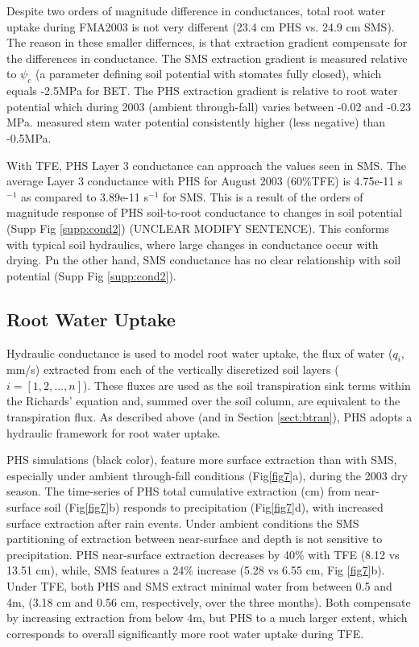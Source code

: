 \documentclass[draft,linenumbers]{agujournal}
\begin{document}
    Despite two orders of magnitude difference in conductances, total root water uptake during FMA2003 is not very different (23.4 cm PHS vs. 24.9 cm SMS).
    The reason in these smaller differnces, is that extraction gradient compensate for the differences in conductance.
    The SMS extraction gradient is measured relative to $\psi_c$ (a parameter defining soil potential with stomates fully closed), which equals -2.5MPa for BET.
    The PHS extraction gradient is relative to root water potential which during 2003 (ambient through-fall) varies between -0.02 and -0.23 MPa.
    \citet{fisher2006} measured stem water potential consistently higher (less negative) than -0.5MPa.
    
    With TFE, PHS Layer 3 conductance can approach the values seen in SMS. 
    The average Layer 3 conductance with PHS for August 2003 (60\%TFE) is 4.75e-11 s$^{-1}$ as compared to 3.89e-11 s$^{-1}$ for SMS.
    This is a result of the orders of magnitude response of PHS soil-to-root conductance to changes in soil potential (Supp Fig \ref{supp:cond2}) (UNCLEAR MODIFY SENTENCE). 
    This conforms with typical soil hydraulics, where large changes in conductance occur with drying.
    Pn the other hand, SMS conductance has no clear relationship with soil potential (Supp Fig \ref{supp:cond2}). 

\subsection{Root Water Uptake}
\label{sect:rwu}

    Hydraulic conductance is used to model root water uptake, the flux of water ($q_i$, mm/s) 
    extracted from each of the vertically discretized soil layers ($i=\left[1,2,...,n\right]$).
    These fluxes are used as the soil transpiration sink terms within the Richards' equation \citep{oleson2013} and, summed over the soil column, are equivalent to the transpiration flux.
    As described above (and in Section \ref{sect:btran}), PHS adopts a hydraulic framework for root water uptake. 

    PHS simulations (black color), feature more surface extraction than with SMS, especially under ambient through-fall conditions (Fig\ref{fig7}a), during the 2003 dry season.
    The time-series of PHS total cumulative extraction (cm) from near-surface soil (Fig\ref{fig7}b) responds to precipitation (Fig\ref{fig7}d), 
    with increased surface extraction after rain events.
    Under ambient conditions the SMS partitioning of extraction between near-surface and depth is not sensitive to precipitation.
    PHS near-surface extraction decreases by 40\% with TFE (8.12 vs 13.51 cm), while, SMS features a 24\% increase (5.28 vs 6.55 cm, Fig \ref{fig7}b).
    Under TFE, both PHS and SMS extract minimal water from between 0.5 and 4m, (3.18 cm and 0.56 cm, respectively, over the three months).
    Both compensate by increasing extraction from below 4m, but PHS to a much larger extent, which corresponds to overall significantly more root water uptake during TFE.
    
\end{document}
